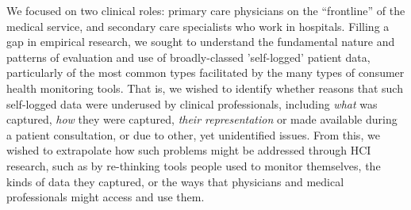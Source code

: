 \documentclass{sigchi}
\begin{document}
We focused on two clinical roles: primary care physicians on the ``frontline'' of the medical service, and secondary care specialists who work in hospitals.  Filling a gap in empirical research, we sought to understand the fundamental nature and patterns of evaluation and use of broadly-classed 'self-logged' patient data, particularly of the most common types facilitated by the many types of consumer health monitoring tools.  That is, we wished to identify whether reasons that such self-logged data were underused by clinical professionals, including \emph{what} was captured, \emph{how} they were  captured,  \emph{their representation} or made available during a patient consultation, or  due to other, yet unidentified issues.  From this, we wished to extrapolate how such problems might be addressed through HCI research, such as by re-thinking tools people used to monitor themselves, the kinds of data they captured, or the ways that physicians and medical professionals might access and use them.



\end{document}
